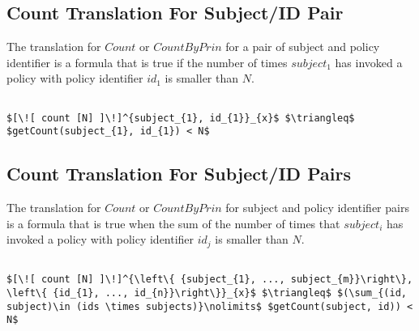 \subsection{Count Translation For Subject/ID Pair}
The translation for $Count$ or $CountByPrin$ for a pair of subject and policy identifier is a formula that is true if the number of times $subject_{1}$ has invoked a policy with policy identifier $id_{1}$ is smaller than $N$.

\lstset{mathescape, language=AST}  
\begin{lstlisting}[frame=single, caption={Count Translation {$\colon$} subject and policyId Pair},label={lst:transcountSinglePair}]

$[\![ count [N] ]\!]^{subject_{1}, id_{1}}_{x}$ $\triangleq$ $getCount(subject_{1}, id_{1}) < N$
\end{lstlisting}

\subsection{Count Translation For Subject/ID Pairs}
The translation for $Count$ or $CountByPrin$ for subject and policy identifier pairs is a formula that is true when the sum of the number of times that $subject_{i}$ has invoked a policy with policy identifier $id_{j}$ is smaller than $N$.

\lstset{mathescape, language=AST}  
\begin{lstlisting}[frame=single, caption={Count Translation {$\colon$} subject and policyId Pairs},label={lst:transcountSinglePairs}]

$[\![ count [N] ]\!]^{\left\{ {subject_{1}, ..., subject_{m}}\right\}, \left\{ {id_{1}, ..., id_{n}}\right\}}_{x}$ $\triangleq$ $(\sum_{(id, subject)\in (ids \times subjects)}\nolimits$ $getCount(subject, id)) < N$

\end{lstlisting}





